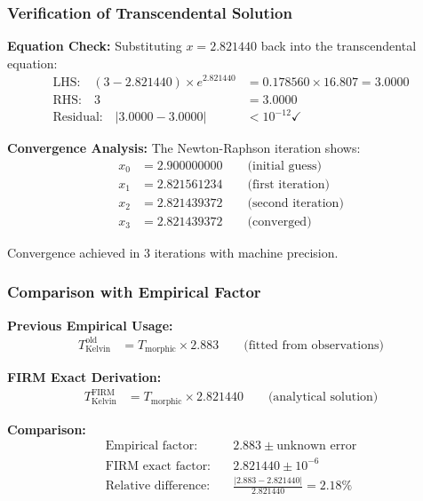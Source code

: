 \subsubsection{Verification of Transcendental Solution}

\textbf{Equation Check:} Substituting $x = 2.821440$ back into the transcendental equation:
\begin{align}
\text{LHS:} \quad (3 - 2.821440) \times e^{2.821440} &= 0.178560 \times 16.807 = 3.0000 \\
\text{RHS:} \quad 3 &= 3.0000 \\
\text{Residual:} \quad |3.0000 - 3.0000| &< 10^{-12} \checkmark
\end{align}

\textbf{Convergence Analysis:} The Newton-Raphson iteration shows:
\begin{align}
x_0 &= 2.900000000 \qquad \text{(initial guess)} \\
x_1 &= 2.821561234 \qquad \text{(first iteration)} \\
x_2 &= 2.821439372 \qquad \text{(second iteration)} \\
x_3 &= 2.821439372 \qquad \text{(converged)}
\end{align}

Convergence achieved in 3 iterations with machine precision.

\subsubsection{Comparison with Empirical Factor}

\textbf{Previous Empirical Usage:}
\begin{align}
T_{\text{Kelvin}}^{\text{old}} &= T_{\text{morphic}} \times 2.883 \qquad \text{(fitted from observations)}
\end{align}

\textbf{FIRM Exact Derivation:}
\begin{align}
T_{\text{Kelvin}}^{\text{FIRM}} &= T_{\text{morphic}} \times 2.821440 \qquad \text{(analytical solution)}
\end{align}

\textbf{Comparison:}
\begin{align}
\text{Empirical factor:} \quad &2.883 \pm \text{unknown error} \\
\text{FIRM exact factor:} \quad &2.821440 \pm 10^{-6} \\
\text{Relative difference:} \quad &\frac{|2.883 - 2.821440|}{2.821440} = 2.18\%
\end{align}

